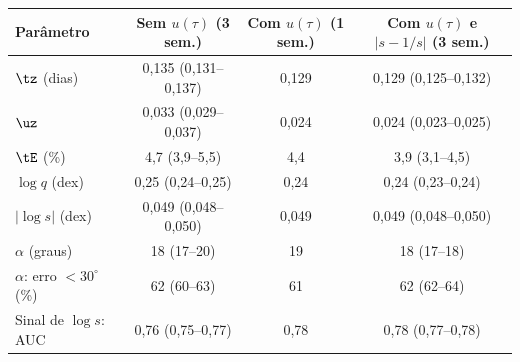 \begin{tabular}{lccc}
	\toprule
	Parâmetro & Sem $u(\tau)$ (3 sem.) & Com $u(\tau)$ (1 sem.) & Com $u(\tau)$ e $|s - 1/s|$ (3 sem.) \\
	\midrule
	$\tz$ (dias) & 0{,}135 (0{,}131--0{,}137) & 0{,}129 & 0{,}129 (0{,}125--0{,}132) \\
	$\uz$ & 0{,}033 (0{,}029--0{,}037) & 0{,}024 & 0{,}024 (0{,}023--0{,}025) \\
	$\tE$ (\%) & 4{,}7 (3{,}9--5{,}5) & 4{,}4 & 3{,}9 (3{,}1--4{,}5) \\
	$\log q$ (dex) & 0{,}25 (0{,}24--0{,}25) & 0{,}24 & 0{,}24 (0{,}23--0{,}24) \\
	$|\log s|$ (dex) & 0{,}049 (0{,}048--0{,}050) & 0{,}049 & 0{,}049 (0{,}048--0{,}050) \\
	$\alpha$ (graus) & 18 (17--20) & 19 & 18 (17--18) \\
	$\alpha$: erro $< 30^\circ$ (\%) & 62 (60--63) & 61 & 62 (62--64) \\
	Sinal de $\log s$: AUC & 0{,}76 (0{,}75--0{,}77) & 0{,}78 & 0{,}78 (0{,}77--0{,}78) \\
	\bottomrule
\end{tabular}
